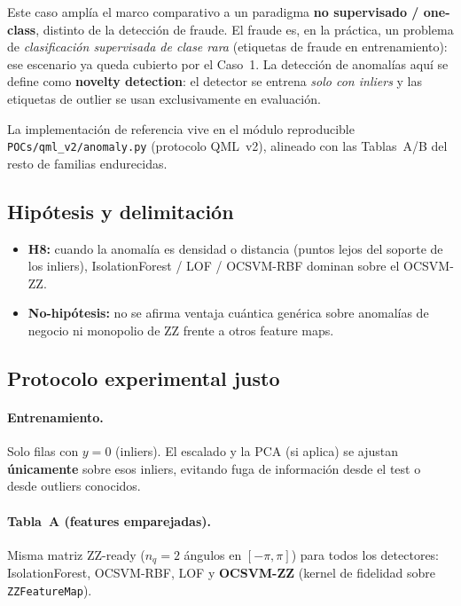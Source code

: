 Este caso amplía el marco comparativo a un paradigma \textbf{no supervisado / one-class}, distinto de la detección de fraude. El fraude es, en la práctica, un problema de \emph{clasificación supervisada de clase rara} (etiquetas de fraude en entrenamiento): ese escenario ya queda cubierto por el Caso~1. La detección de anomalías aquí se define como \textbf{novelty detection}: el detector se entrena \emph{solo con inliers} y las etiquetas de outlier se usan exclusivamente en evaluación.

La implementación de referencia vive en el módulo reproducible \texttt{POCs/qml\_v2/anomaly.py} (protocolo QML~v2), alineado con las Tablas~A/B del resto de familias endurecidas.

\subsection{Hipótesis y delimitación}

\begin{itemize}
  \item \textbf{H8:} cuando la anomalía es densidad o distancia (puntos lejos del soporte de los inliers), IsolationForest / LOF / OCSVM-RBF dominan sobre el OCSVM-ZZ.
  \item \textbf{No-hipótesis:} no se afirma ventaja cuántica genérica sobre anomalías de negocio ni monopolio de ZZ frente a otros feature maps.
\end{itemize}

\subsection{Protocolo experimental justo}

\paragraph{Entrenamiento.} Solo filas con $y=0$ (inliers). El escalado y la PCA (si aplica) se ajustan \textbf{únicamente} sobre esos inliers, evitando fuga de información desde el test o desde outliers conocidos.

\paragraph{Tabla~A (features emparejadas).} Misma matriz ZZ-ready ($n_q=2$ ángulos en $[-\pi,\pi]$) para todos los detectores:
IsolationForest, OCSVM-RBF, LOF y \textbf{OCSVM-ZZ} (kernel de fidelidad sobre \texttt{ZZFeatureMap}).

